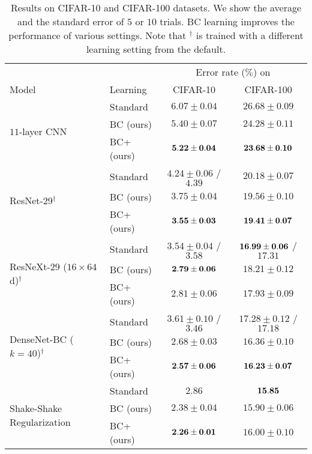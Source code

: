 \documentclass[10pt,twocolumn,letterpaper]{article}
\begin{document}
\begin{table*}
	\centering
	\caption{Results on CIFAR-10 and CIFAR-100 datasets. We show the average and the standard error of $5$ or $10$ trials. BC learning improves the performance of various settings. Note that $^{\dagger}$ is trained with a different learning setting from the default.}
	\label{tab:cifar}
	\vspace{2mm}
	\small
	\begin{tabular}{llcc}
		\toprule
		&& \multicolumn{2}{c}{Error rate ($\%$) on} \\
		\cmidrule{3-4}
		Model & Learning & CIFAR-10 & CIFAR-100 \\
		\midrule
		\multirow{3}{*}{$11$-layer CNN} & Standard & $6.07 \pm0.04 $ & $26.68 \pm0.09$ \\
						 		   & BC (ours) & $5.40 \pm0.07$ & $24.28 \pm0.11$ \\
								   & BC+ (ours) & ${\bf 5.22 \pm0.04}$ & ${\bf 23.68 \pm0.10}$ \\
		\midrule						   
								   
		\multirow{3}{*}{ResNet-29$^\dagger$ \cite{xie2017aggregated}} & Standard & $4.24 \pm 0.06$ / $4.39$ \cite{xie2017aggregated} & $20.18 \pm0.07$ \\
						 		   & BC (ours) & $3.75 \pm0.04$ & $19.56 \pm0.10$ \\
								   & BC+ (ours) & ${\bf 3.55 \pm0.03}$ & ${\bf 19.41 \pm0.07}$ \\
		\midrule
		\multirow{3}{*}{ResNeXt-29 ($16\times64$d)$^\dagger$ \cite{xie2017aggregated}} & Standard & $3.54 \pm 0.04$ / $3.58$ \cite{xie2017aggregated} & ${\bf 16.99 \pm0.06} $ / $17.31$ \cite{xie2017aggregated} \\
						 		   & BC (ours) & ${\bf 2.79 \pm0.06}$ & $18.21 \pm0.12$ \\
								   & BC+ (ours) & $2.81 \pm0.06$ & $17.93 \pm0.09$ \\
		\midrule
		\multirow{3}{*}{DenseNet-BC ($k=40$)$^\dagger$ \cite{huang2017densely}} & Standard & $3.61 \pm 0.10$ / $3.46$ \cite{huang2017densely} & $17.28 \pm0.12 $ / $17.18$ \cite{huang2017densely} \\
						 		   & BC (ours) & $2.68 \pm0.03$ & $16.36 \pm0.10$ \\
								   & BC+ (ours) & ${\bf 2.57 \pm0.06}$ & ${\bf 16.23 \pm0.07}$ \\
		\midrule
		\multirow{3}{*}{Shake-Shake Regularization \cite{gastaldi2017shake}} & Standard & $2.86$ \cite{gastaldi2017shake} & ${\bf 15.85}$ \cite{gastaldi2017shake} \\
						 		   & BC (ours) & $2.38 \pm0.04$ & $15.90 \pm0.06$  \\
								   & BC+ (ours) & ${\bf 2.26 \pm0.01}$ & $16.00 \pm0.10$ \\
		\bottomrule
	\end{tabular}
	\vspace{-2mm}
\end{table*} 
\end{document}

